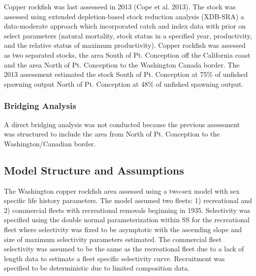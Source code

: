 \documentclass[11pt,
  english,
  a4paper,
]{article}
\begin{document}
\leavevmode\tagmcend\tagstructend


Copper rockfish was last assesseed in 2013 {(Cope et al. 2013)\leavevmode\tagmcend\tagstructend}. The stock was assessed using extended depletion-based stock reduction analysis (XDB-SRA) a data-moderate approach which incorporated catch and index data with prior on select parameters (natural mortality, stock status in a specified year, productivity, and the relative status of maximum productivity). Copper rockfish was assessed as two separated stocks, the area South of Pt. Conception off the California coast and the area North of Pt. Conception to the Washington Canada border. The 2013 assessment estimated the stock South of Pt. Conception at 75\% of unfished spawning output North of Pt. Conception at 48\% of unfished spawning output.

\leavevmode\tagmcend\tagstructend\par


\hypertarget{bridging-analysis}{%
\subsubsection{Bridging Analysis}\label{bridging-analysis}}

\leavevmode\tagmcend\tagstructend


A direct bridging analysis was not conducted because the previous assessment was structured to include the area from North of Pt. Conception to the Washington/Canadian border.

\leavevmode\tagmcend\tagstructend\par


\hypertarget{model-structure-and-assumptions}{%
\subsection{Model Structure and Assumptions}\label{model-structure-and-assumptions}}

\leavevmode\tagmcend\tagstructend


The Washington copper rockfish area assessed using a two-sex model with sex specific life history parameters. The model assumed two fleets: 1) recreational and 2) commercial fleets with recreational removals beginning in 1935. Selectivity was specified using the double normal parameterization within SS for the recreational fleet where selectivity was fixed to be asymptotic with the ascending slope and size of maximum selectivity parameters estimated. The commercial fleet selectivity was assumed to be the same as the recreational fleet due to a lack of length data to estimate a fleet specific selectivity curve. Recruitment was specified to be deterministic due to limited composition data.
\end{document}
